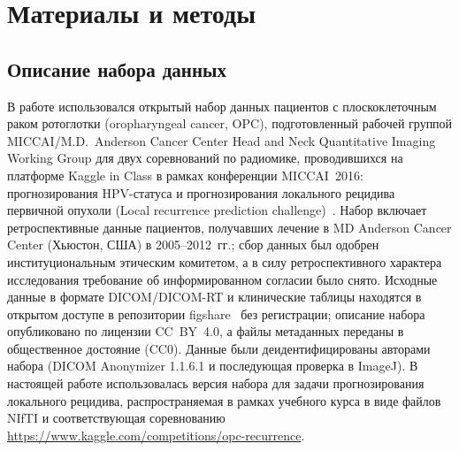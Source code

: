 \documentclass[11pt,a4paper]{article}
\begin{document}
\section{Материалы и методы}

\subsection{Описание набора данных}

В работе использовался открытый набор данных пациентов с плоскоклеточным раком ротоглотки (oropharyngeal cancer, OPC), подготовленный рабочей группой MICCAI/M.D.~Anderson Cancer Center Head and Neck Quantitative Imaging Working Group для двух соревнований по радиомике, проводившихся на платформе Kaggle in Class в рамках конференции MICCAI~2016: прогнозирования HPV-статуса и прогнозирования локального рецидива первичной опухоли (Local recurrence prediction challenge)~\cite{elhalawani2017}. Набор включает ретроспективные данные пациентов, получавших лечение в MD Anderson Cancer Center (Хьюстон, США) в 2005--2012~гг.; сбор данных был одобрен институциональным этическим комитетом, а в силу ретроспективного характера исследования требование об информированном согласии было снято. Исходные данные в формате DICOM/DICOM-RT и клинические таблицы находятся в открытом доступе в репозитории figshare~\cite{figshare_lrp, figshare_hpv} без регистрации; описание набора опубликовано по лицензии CC~BY~4.0, а файлы метаданных переданы в общественное достояние (CC0). Данные были деидентифицированы авторами набора (DICOM Anonymizer 1.1.6.1 и последующая проверка в ImageJ). В настоящей работе использовалась версия набора для задачи прогнозирования локального рецидива, распространяемая в рамках учебного курса в виде файлов NIfTI и соответствующая соревнованию \url{https://www.kaggle.com/competitions/opc-recurrence}.
\end{document}
